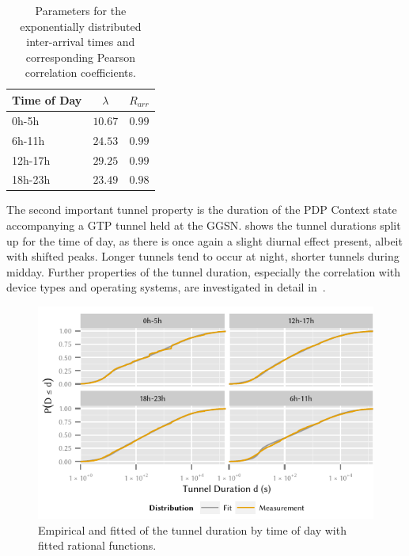 \begin{table}
  \centering
  \caption{Parameters for the exponentially distributed inter-arrival times and corresponding Pearson correlation coefficients.}
  \label{tab:cloud:virtualized_network_functions:measurement_data:evaluation:iat_fits}  
  \begin{tabular}{lcc}
  \toprule
  Time of Day & \(\lambda\) & \(R_{arr}\)\\
  \midrule
  0h-5h & $10.67$ & $0.99$\\
  6h-11h & $24.53$ & $0.99$\\
  12h-17h & $29.25$ & $0.99$\\
  18h-23h & $23.49$ & $0.98$\\
   \bottomrule
  \end{tabular}
\end{table}

The second important tunnel property is the duration of the \gls{PDP} Context state accompanying a \gls{GTP} tunnel held at the \gls{GGSN}.
 shows the tunnel durations split up for the time of day, as there is once again a slight diurnal effect present, albeit with shifted peaks.
Longer tunnels tend to occur at night, shorter tunnels during midday.
Further properties of the tunnel duration, especially the correlation with device types and operating systems, are investigated in detail in~\cite{Metzger2014}.

\begin{figure}
  \centering
  \includegraphics{cloud/virtualized_network_functions/measurement_data/figures/tunnel_duration}
  \caption{Empirical and fitted  of the tunnel duration by time of day with fitted rational functions.}
  \label{fig:cloud:virtualized_network_functions:measurement_data:evaluation:tunnel_duration}
\end{figure}

